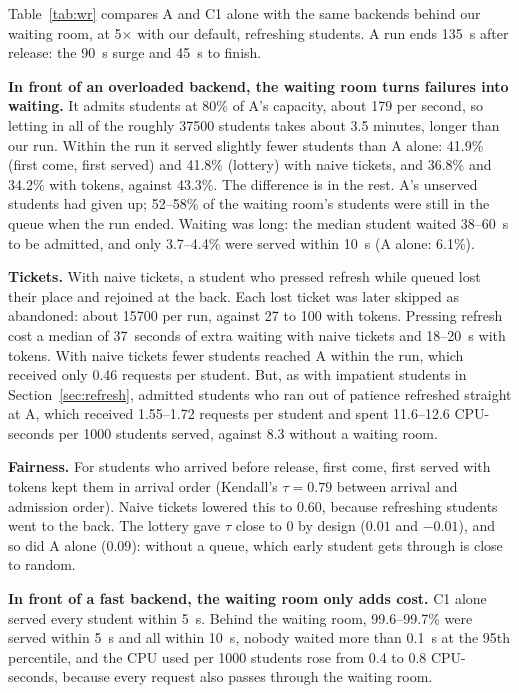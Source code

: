 

Table~\ref{tab:wr} compares A and C1 alone with the same backends behind our
waiting room, at 5$\times$ with our default, refreshing students. A run ends
\SI{135}{s} after release: the \SI{90}{s} surge and \SI{45}{s} to finish.

\textbf{In front of an overloaded backend, the waiting room turns failures
into waiting.} It admits students at 80\% of A's capacity, about 179 per
second, so letting in all of the roughly \num{37500} students takes about 3.5
minutes, longer than our run. Within the run it served slightly fewer students
than A alone: 41.9\% (first come, first served) and 41.8\% (lottery) with
naive tickets, and 36.8\% and 34.2\% with tokens, against 43.3\%. The
difference is in the rest. A's unserved students had given up; 52--58\% of the
waiting room's students were still in the queue when the run ended. Waiting
was long: the median student waited 38--\SI{60}{s} to be admitted, and only
3.7--4.4\% were served within \SI{10}{s} (A alone: 6.1\%).

\textbf{Tickets.} With naive tickets, a student who pressed refresh while
queued lost their place and rejoined at the back. Each lost ticket was later
skipped as abandoned: about \num{15700} per run, against 27 to 100 with tokens.
Pressing refresh cost a median of 37~seconds of extra waiting with naive
tickets and 18--\SI{20}{s} with tokens. With naive tickets fewer students
reached A within the run, which received only 0.46 requests per student. But, as with impatient
students in Section~\ref{sec:refresh}, admitted students who ran out of
patience refreshed straight at A, which received 1.55--1.72 requests per
student and spent 11.6--12.6 CPU-seconds per \num{1000} students served,
against 8.3 without a waiting room.

\textbf{Fairness.} For students who arrived before release, first come, first
served with tokens kept them in arrival order (Kendall's $\tau=0.79$ between
arrival and admission order). Naive tickets lowered this to 0.60, because
refreshing students went to the back. The lottery gave $\tau$ close to 0 by
design ($0.01$ and $-0.01$), and so did A alone ($0.09$): without a queue,
which early student gets through is close to random.

\textbf{In front of a fast backend, the waiting room only adds cost.} C1 alone
served every student within \SI{5}{s}. Behind the waiting room, 99.6--99.7\%
were served within \SI{5}{s} and all within \SI{10}{s}, nobody waited more
than \SI{0.1}{s} at the 95th percentile, and the CPU used per \num{1000}
students rose from 0.4 to 0.8 CPU-seconds, because every request also passes
through the waiting room.

